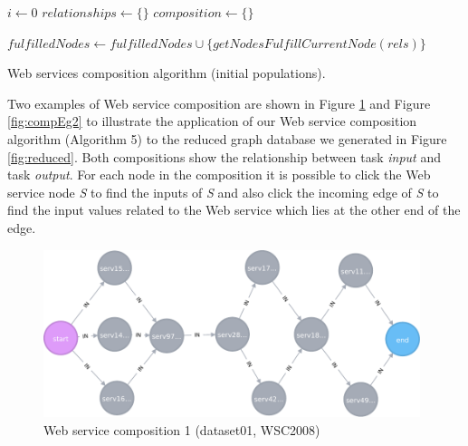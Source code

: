\begin{algorithm}[h]
 \LinesNumbered
 \SetNlSty{}{}{:}
   $i \leftarrow 0$\;
   $relationships \leftarrow \{\}$\;
   $composition \leftarrow \{\}$\; 

   $fulfilledNodes \leftarrow fulfilledNodes \cup \{getNodesFulfillCurrentNode(rels)\}$\;
 \caption{\footnotesize Web services composition algorithm (initial populations).}
\label{generation}
\end{algorithm}
\setlength{\textfloatsep}{20pt}%

Two examples of Web service composition are shown in Figure \ref{fig:compEg1} and Figure \ref{fig:compEg2} to illustrate the application of our Web service composition algorithm (Algorithm 5) to the reduced graph database we generated in Figure \ref{fig:reduced}. Both compositions show the relationship between task \emph{input} and task \emph{output}. For each node in the composition it is possible to click the Web service node \emph{S} to find the inputs of \emph{S} and also click the incoming edge of \emph{S} to find the input values related to the Web service which lies at the other end of the edge. \par
\begin{figure}[h]
\includegraphics[width=11cm]{svg-composition1.pdf}
\centering
\caption{Web service composition 1 (dataset01, WSC2008)}
\label{fig:compEg1} 
\end{figure} 

